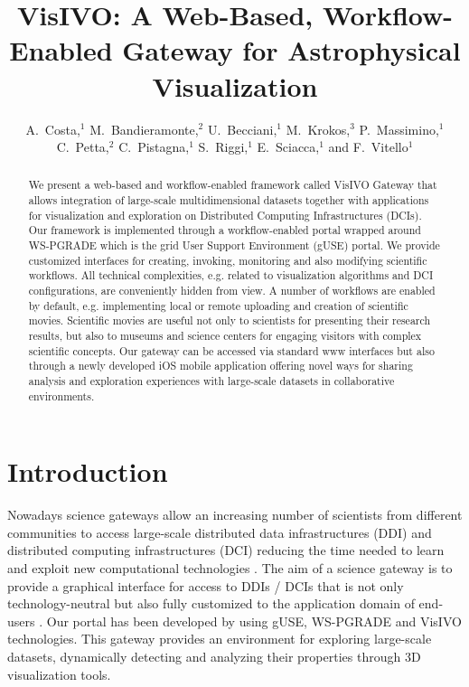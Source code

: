 
\resetcounters




\title{VisIVO: A Web-Based, Workflow-Enabled Gateway for Astrophysical Visualization}
\author{A.~Costa,$^1$ M.~Bandieramonte,$^2$ U.~Becciani,$^1$ M.~Krokos,$^3$ P.~Massimino,$^1$ C.~Petta,$^2$ C.~Pistagna,$^1$ S.~Riggi,$^1$ E.~Sciacca,$^1$ and F.~Vitello$^1$}


\begin{abstract}
We present a web-based and workflow-enabled framework called VisIVO Gateway that allows integration of large-scale multidimensional datasets together with applications for visualization and exploration on Distributed Computing Infrastructures (DCIs). Our framework is implemented through a workflow-enabled portal wrapped around WS-PGRADE which is the grid User Support Environment (gUSE) portal.  We provide customized interfaces for creating, invoking, monitoring and also modifying scientific workflows. All technical complexities, e.g. related to visualization algorithms and DCI configurations, are conveniently hidden from view. A number of workflows are enabled by default, e.g. implementing local or remote uploading and creation of scientific movies. Scientific movies are useful not only to scientists for presenting their research results, but also to museums and science centers for engaging visitors with complex scientific concepts. Our gateway can be accessed via standard www interfaces but also through a newly developed iOS mobile application offering novel ways for sharing analysis and exploration experiences with large-scale datasets in collaborative environments.
\end{abstract}

\section{Introduction}
Nowadays science gateways allow an increasing number of scientists from different communities to access large-scale distributed data infrastructures (DDI) and distributed computing infrastructures (DCI) reducing the time needed to learn and exploit new computational technologies \citep{borkin2011visualization}. The aim of a science gateway is to provide a graphical interface for access to DDIs / DCIs that is not only technology-neutral but also fully customized to the application domain of end-users \citep{abt_1990}. Our portal has been developed by using gUSE, WS-PGRADE  \citep{kacsuk2011p}  and VisIVO \citep{becciani2010visivo} technologies. This gateway provides an environment for exploring large-scale datasets, dynamically detecting and analyzing their properties through 3D visualization tools. 

